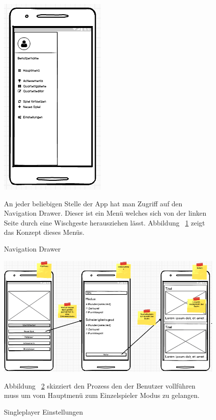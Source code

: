 \documentclass{scrartcl}
\begin{document}
\begin{figure}[!ht]
\begin{center}
	\includegraphics[scale=0.75]{img/mockup_drawer.png}
	\caption{Navigation Drawer}
	\label{drawer}
\end{center}
An jeder beliebigen Stelle der App hat man Zugriff auf den Navigation Drawer. Dieser ist ein Menü welches sich von der linken Seite durch eine Wischgeste herausziehen lässt. Abbildung ~\ref{drawer} zeigt das Konzept dieses Menüs.
\end{figure}

\begin{figure}[!ht]
\begin{center}
	\includegraphics[scale=0.7]{img/mockup_game_process_1.png}
	\caption{Singleplayer Einstellungen}
	\label{singleplayer1}
\end{center}
Abbildung ~\ref{singleplayer1} skizziert den Prozess den der Benutzer vollführen muss um vom Hauptmenü zum Einzelspieler Modus zu gelangen.
\end{figure}
\end{document}
